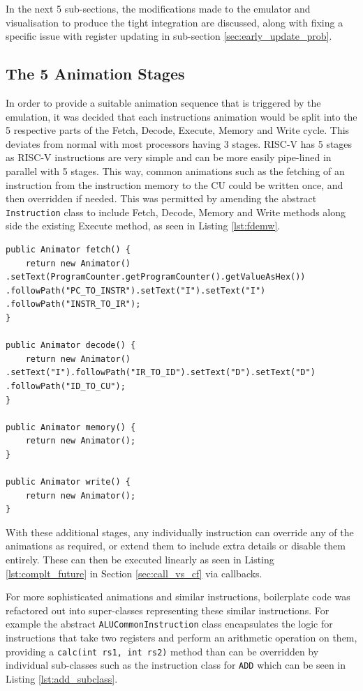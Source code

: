 In the next 5 sub-sections, the modifications made to the emulator and visualisation to produce the tight integration are discussed, along with fixing a specific issue with register updating in sub-section \ref{sec:early_update_prob}.

\subsection{The 5 Animation Stages}
In order to provide a suitable animation sequence that is triggered by the emulation, it was decided that each instructions animation would be split into the 5 respective parts of the Fetch, Decode, Execute, Memory and Write cycle. This deviates from normal with most processors having 3 stages. RISC-V has 5 stages as RISC-V instructions are very simple and can be more easily pipe-lined in parallel with 5 stages. This way, common animations such as the fetching of an instruction from the instruction memory to the \ac{CU} could be written once, and then overridden if needed. This was permitted by amending the abstract \texttt{Instruction} class to include Fetch, Decode, Memory and Write methods along side the existing Execute method, as seen in Listing \ref{lst:fdemw}.

\begin{lstlisting}[caption={Additional Fetch, Decode, Memeory and Write methods added to the abstract \texttt{Instruction } class}, label=lst:fdemw]
public Animator fetch() {
    return new Animator() .setText(ProgramCounter.getProgramCounter().getValueAsHex()) .followPath("PC_TO_INSTR").setText("I").setText("I") .followPath("INSTR_TO_IR");
}

public Animator decode() {
    return new Animator() .setText("I").followPath("IR_TO_ID").setText("D").setText("D") .followPath("ID_TO_CU");
}

public Animator memory() {
    return new Animator();
}

public Animator write() {
    return new Animator();
}
\end{lstlisting}

With these additional stages, any individually instruction can override any of the animations as required, or extend them to include extra details or disable them entirely. These can then be executed linearly as seen in Listing \ref{lst:complt_future} in Section \ref{sec:call_vs_cf} via callbacks.

For more sophisticated animations and similar instructions, boilerplate code was refactored out into super-classes representing these similar instructions. For example the abstract \texttt{ALUCommonInstruction} class encapsulates the logic for instructions that take two registers and perform an arithmetic operation on them, providing a \verb|calc(int rs1, int rs2)| method than can be overridden by individual sub-classes such as the instruction class for \texttt{ADD} which can be seen in Listing \ref{lst:add_subclass}.

